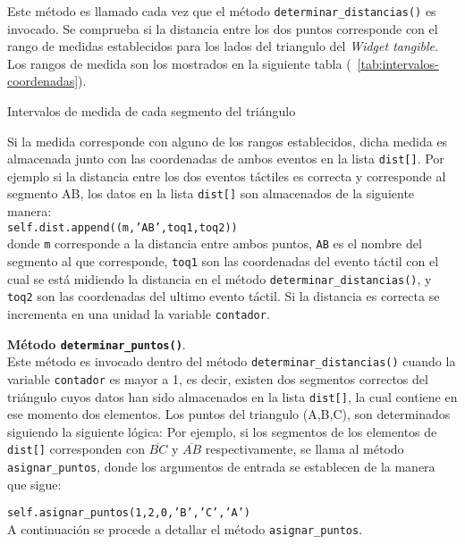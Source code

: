 Este método es llamado cada vez que el método \texttt{determinar\_distancias()} es invocado.
Se comprueba si la distancia entre los dos puntos corresponde con el rango de medidas establecidos para los lados del triangulo del \emph{Widget tangible}. Los rangos de medida son los mostrados en la siguiente tabla (~\ref{tab:intervalos-coordenadas}).

\begin{table}[hp]
  \centering
  {\small
  
  }
  \caption[Intervalos de medida de cada segmento del triángulo]
  {Intervalos de medida de cada segmento del triángulo}
  \label{tab:intervalos-coordenadas}
\end{table}
Si la medida corresponde con alguno de los rangos establecidos, dicha medida es almacenada junto con las coordenadas de ambos eventos en la lista \texttt{dist[]}. Por ejemplo si la distancia entre los dos eventos táctiles es correcta y corresponde al segmento AB, los datos en la lista \texttt{dist[]} son almacenados de la siguiente manera:\\
\texttt{self.dist.append((m,'AB',toq1,toq2)) }\\
donde \texttt{m} corresponde a la distancia entre ambos puntos, \texttt{AB} es el nombre del segmento al que corresponde, \texttt{toq1} son las coordenadas del evento táctil con el cual se está midiendo la distancia en el método \texttt{determinar\_distancias()}, y \texttt{toq2} son las coordenadas del ultimo evento táctil.
Si la distancia es correcta se incrementa en una unidad la variable \texttt{contador}.

\textbf{Método \texttt{determinar\_puntos()}}.\\
Este método es invocado dentro del método \texttt{determinar\_distancias()} cuando la variable \texttt{contador} es mayor a 1, es decir, existen dos segmentos correctos del triángulo cuyos datos han sido almacenados en la lista \texttt{dist[]}, la cual contiene en ese momento dos elementos.
Los puntos del triangulo (A,B,C), son determinados siguiendo la siguiente lógica:
Por ejemplo, si los segmentos de los elementos de \texttt{dist[]} corresponden con $\overline{BC}$ y  $\overline{AB}$ respectivamente, se llama al método \texttt{asignar\_puntos}, donde los argumentos de entrada se establecen de la manera que sigue:

\texttt{self.asignar\_puntos(1,2,0,'B','C','A')}\\

A continuación se procede a detallar el método \texttt{asignar\_puntos}.

